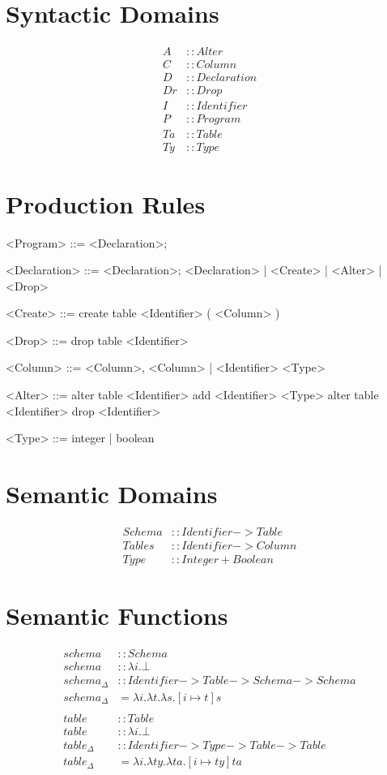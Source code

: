 \documentclass[12pt]{article}
\begin{document}
\section{Syntactic Domains}
\begin{align*}
  A &:: Alter \\
  C &:: Column \\
  D &:: Declaration \\
  Dr &:: Drop \\
  I &:: Identifier \\
  P &:: Program \\
  Ta &:: Table \\
  Ty &:: Type
\end{align*}

\section{Production Rules}
\begin{grammar}
  <Program> ::= <Declaration>;

  <Declaration> ::= <Declaration>; <Declaration> | <Create> | <Alter> | <Drop>

  <Create> ::= create table <Identifier> ( <Column> )

  <Drop> ::= drop table <Identifier>

  <Column> ::= <Column>, <Column> | <Identifier> <Type>

  <Alter> ::= alter table <Identifier> add <Identifier> <Type>
           \alt alter table <Identifier> drop <Identifier>

  <Type> ::= integer | boolean
\end{grammar}

\section{Semantic Domains}
\begin{align*}
  Schema &:: Identifier -> Table \\
  Tables &:: Identifier -> Column \\
  Type &:: Integer + Boolean
\end{align*}

\section{Semantic Functions}
\begin{align*}
  schema &:: Schema \\
  schema &:: \lambda i.\bot \\
  schema_{\Delta} &:: Identifier -> Table -> Schema -> Schema \\
  schema_{\Delta} &= \lambda i. \lambda t. \lambda s. [ i \mapsto t ]s \\
  \\
  table &:: Table \\
  table &:: \lambda i.\bot \\
  table_{\Delta} &:: Identifier -> Type -> Table -> Table \\
  table_{\Delta} &= \lambda i. \lambda ty. \lambda ta. [ i \mapsto ty ]ta
\end{align*}
\end{document}
